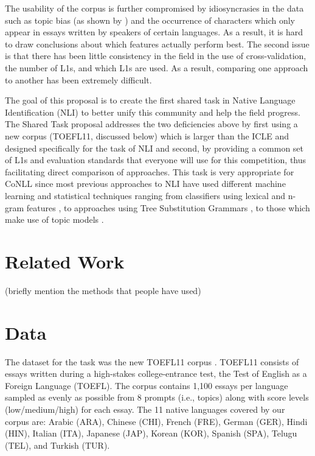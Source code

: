 \documentclass[11pt,letterpaper]{article}
\begin{document}
The usability of the corpus is further compromised by idiosyncrasies in the
data such as topic bias (as shown by \cite{brooke2011native}) and the
occurrence of characters which only appear in essays
written by speakers of certain languages. As a result, it is hard to draw
conclusions about which features actually perform best. The second issue is
that there has been little consistency in the field in the use of
cross-validation, the number of L1s, and which L1s are used. As a result,
comparing one approach to another has been extremely difficult.

The goal of this proposal is to create the first shared task in Native
Language Identification (NLI) to better unify this community and help the
field progress. The Shared Task proposal addresses the two deficiencies above
by first using a new corpus (TOEFL11, discussed below) which is larger than
the ICLE and designed specifically for the task of NLI and second, by
providing a common set of L1s and evaluation standards that everyone will use
for this competition, thus facilitating direct comparison of approaches. This
task is very appropriate for CoNLL since most previous approaches
to NLI have used different machine learning and statistical techniques
ranging from classifiers using lexical and n-gram features
\cite{koppel2005determining}, to approaches using Tree Substitution Grammars
\cite{swanson-charniak:2012:ACL2012short}, to those which make use of
topic models \cite{Sze-MengJojoWongMarkDrasMarkJohnson:2011:ALTA2011}.


\section{Related Work}

(briefly mention the methods that people have used)



\section{Data}
The dataset for the task was the new TOEFL11 corpus
\cite{blanchard-tetreault-higgins-cahill-chodorow:2013:TOEFL11-RR}. TOEFL11
consists of essays written during a high-stakes college-entrance test, the Test
of English as a Foreign Language (TOEFL\textsuperscript{\textregistered}). The
corpus contains 1,100 essays per language sampled as evenly as possible from 8
prompts (i.e., topics) along with score levels (low/medium/high) for each essay.
The 11 native languages covered by our corpus are: Arabic (ARA), Chinese
(CHI), French (FRE), German (GER), Hindi (HIN), Italian (ITA), Japanese
(JAP), Korean (KOR), Spanish (SPA), Telugu (TEL), and Turkish (TUR).
\end{document}

